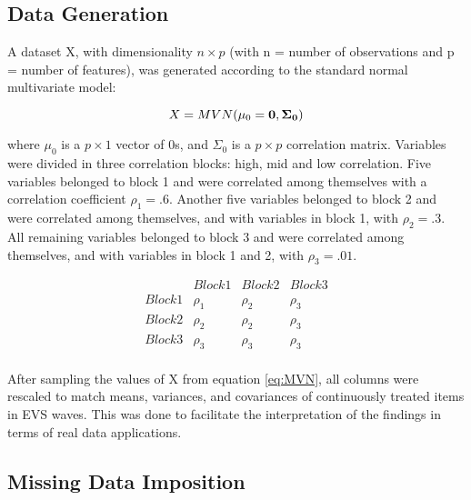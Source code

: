 \subsection{Data Generation}

A dataset X, with dimensionality $n \times p$ (with n = number of observations and p = number of features),
was generated according to the standard normal multivariate model:

\begin{equation}
	X = MVN(\mu_0 = \bf{0}, \Sigma_0) \label{eq:MVN}
\end{equation}

where $\mu_0$ is a $p \times 1$ vector of 0s, and $\Sigma_0$ is a $p \times p$ correlation matrix. Variables were divided in 
three correlation blocks: high, mid and low correlation. Five variables belonged to block 1 and were correlated among themselves with 
a correlation coefficient $\rho_1 = .6$. Another five variables belonged to block 2 and were correlated among themselves, and with variables in 
block 1, with $\rho_2 = .3$. All remaining variables belonged to block 3 and were correlated among themselves, and with variables in 
block 1 and 2, with $\rho_3 = .01$. 

$$
\begin{matrix}
		& Block 1 	& Block 2	& Block 3	\\
	Block 1	& \rho_1	& \rho_2 	& \rho_3 	\\
	Block 2 & \rho_2	& \rho_2	& \rho_3 	\\
	Block 3	& \rho_3 	& \rho_3	& \rho_3 	\\
\end{matrix}
$$

After sampling the values of X from equation \ref{eq:MVN}, all columns were rescaled to match means, variances, and 
covariances of continuously treated items in EVS waves. This was done to facilitate the interpretation of the findings
in terms of real data applications. 

\iffalse %
Looking at 10 points EVS items on democratic beliefs and moral values in the 2017 
EVS wave, we noticed that on average these items have means and variances around 5. Hence, each variable in X was centred 
around 5 (instead of 0) and scaled to have variance around 5 (instead of 1). As a result the covariances between variables
were also rescaled to match EVS data: correlations of .6 and .3 translated to covariances of 3 and 1.5 respectively.
\fi

\subsection{Missing Data Imposition}

